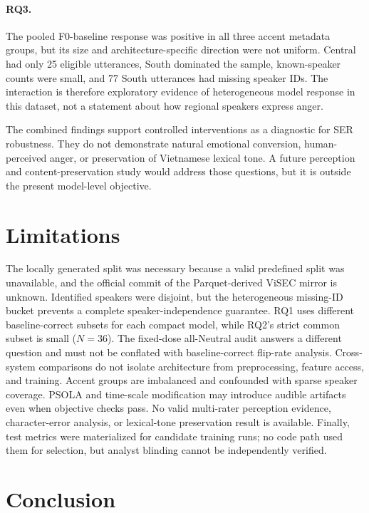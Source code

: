 \documentclass[a4paper,runningheads]{llncs}
\begin{document}
\paragraph{RQ3.} The pooled F0-baseline response was positive in all three accent metadata groups, but its size and architecture-specific direction were not uniform. Central had only 25 eligible utterances, South dominated the sample, known-speaker counts were small, and 77 South utterances had missing speaker IDs. The interaction is therefore exploratory evidence of heterogeneous model response in this dataset, not a statement about how regional speakers express anger.

The combined findings support controlled interventions as a diagnostic for SER robustness. They do not demonstrate natural emotional conversion, human-perceived anger, or preservation of Vietnamese lexical tone. A future perception and content-preservation study would address those questions, but it is outside the present model-level objective.

\section{Limitations}

The locally generated split was necessary because a valid predefined split was unavailable, and the official commit of the Parquet-derived ViSEC mirror is unknown. Identified speakers were disjoint, but the heterogeneous missing-ID bucket prevents a complete speaker-independence guarantee. RQ1 uses different baseline-correct subsets for each compact model, while RQ2's strict common subset is small ($N=36$). The fixed-dose all-Neutral audit answers a different question and must not be conflated with baseline-correct flip-rate analysis. Cross-system comparisons do not isolate architecture from preprocessing, feature access, and training. Accent groups are imbalanced and confounded with sparse speaker coverage. PSOLA and time-scale modification may introduce audible artifacts even when objective checks pass. No valid multi-rater perception evidence, character-error analysis, or lexical-tone preservation result is available. Finally, test metrics were materialized for candidate training runs; no code path used them for selection, but analyst blinding cannot be independently verified.

\section{Conclusion}
\end{document}
